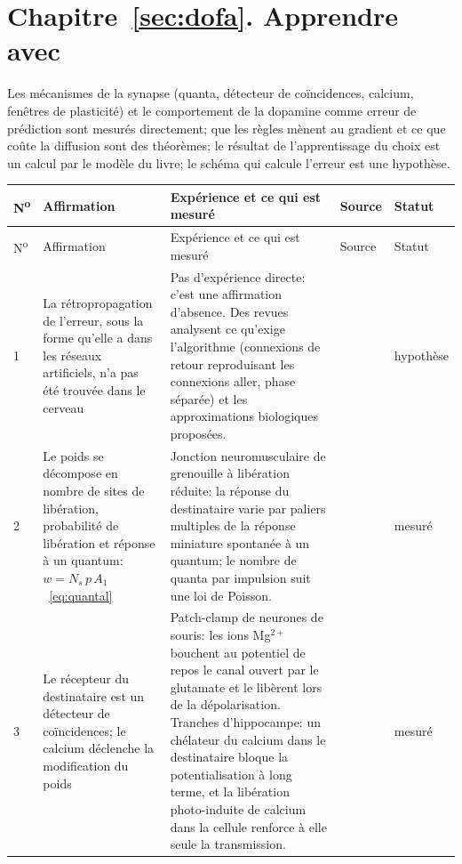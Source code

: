 \section{Chapitre~\ref{sec:dofa}. Apprendre avec }

Les mécanismes de la synapse (quanta, détecteur de coïncidences, calcium, fenêtres de plasticité) et le comportement de la dopamine comme erreur de prédiction sont mesurés directement; que les règles mènent au gradient et ce que coûte la diffusion sont des théorèmes; le résultat de l'apprentissage du choix est un calcul par le modèle du livre; le schéma qui calcule l'erreur est une hypothèse.

{\footnotesize
\setlength{\tabcolsep}{3pt}\renewcommand{\arraystretch}{1.15}
\begin{longtable}{>{\raggedright}p{0.5cm}>{\raggedright}p{4.0cm}>{\raggedright}p{5.6cm}>{\raggedright}p{2.3cm}>{\raggedright\arraybackslash}p{1.7cm}}
\toprule
N\textsuperscript{o} & Affirmation & Expérience et ce qui est mesuré & Source & Statut \\
\midrule\endfirsthead
\toprule
N\textsuperscript{o} & Affirmation & Expérience et ce qui est mesuré & Source & Statut \\
\midrule\endhead
1 & La rétropropagation de l'erreur, sous la forme qu'elle a dans les réseaux artificiels, n'a pas été trouvée dans le cerveau & Pas d'expérience directe: c'est une affirmation d'absence. Des revues analysent ce qu'exige l'algorithme (connexions de retour reproduisant les connexions aller, phase séparée) et les approximations biologiques proposées. & \cite{Lillicrap2020, WhittingtonBogacz2019} & hypothèse \\
2 & Le poids se décompose en nombre de sites de libération, probabilité de libération et réponse à un quantum: $w=N_s\,p\,A_1$~\eqref{eq:quantal} & Jonction neuromusculaire de grenouille à libération réduite: la réponse du destinataire varie par paliers multiples de la réponse miniature spontanée à un quantum; le nombre de quanta par impulsion suit une loi de Poisson. & \cite{delCastillo1954} & mesuré \\
3 & Le récepteur du destinataire est un détecteur de coïncidences; le calcium déclenche la modification du poids & Patch-clamp de neurones de souris: les ions Mg$^{2+}$ bouchent au potentiel de repos le canal ouvert par le glutamate et le libèrent lors de la dépolarisation. Tranches d'hippocampe: un chélateur du calcium dans le destinataire bloque la potentialisation à long terme, et la libération photo-induite de calcium dans la cellule renforce à elle seule la transmission. & \cite{Nowak1984, Malenka1988calcium} & mesuré \\

\end{longtable}}
